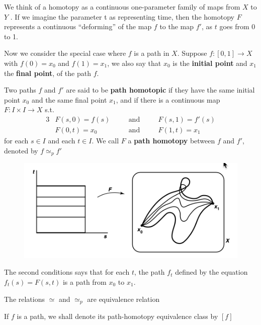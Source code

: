 \documentclass[11pt]{article}
\begin{document}
We think of a homotopy as a continuous one-parameter family of maps from \(X\) to \(Y\) . If we
imagine the parameter t as representing time, then the homotopy \(F\) represents a continuous
``deforming''  of the map \(f\) to the map \(f'\), as \(t\) goes from 0 to 1.

Now we consider the special case where \(f\) is a path in \(X\). Suppose \(f:[0,1]\to X\)
with \(f(0)=x_0\) and \(f(1)=x_1\), we also say that \(x_0\) is the \textbf{initial point} and \(x_1\) the
\textbf{final point}, of the path \(f\).

\begin{definition}[]
Two paths \(f\) and \(f'\) are said to be \textbf{path homotopic} if they have the same initial
point \(x_0\) and the same final point \(x_1\), and if there is a continuous map \(F:I\times I\to X\)
s.t.
\begin{alignat*}{3}
&F(s,0)=f(s)\quad&&\text{and}\quad&&F(s,1)=f'(s)\\
&F(0,t)=x_0&&\text{and }&&F(1,t)=x_1
\end{alignat*}
for each \(s\in I\) and each \(t\in I\). We call \(F\) a \textbf{path homotopy} between \(f\) and \(f'\),
denoted by \(f\simeq_p f'\)
\begin{figure}[htbp]
\centering
\includegraphics[width=.9\textwidth]{../images/Topology/9.png}
\label{}
\end{figure}
\end{definition}

The second conditions says that for each \(t\), the path \(f_t\) defined by the
equation \(f_t(s)=F(s,t)\) is a path from \(x_0\) to \(x_1\).

\begin{lemma}[]
The relations \(\simeq\) and \(\simeq_p\) are equivalence relation
\end{lemma}

If \(f\) is a path, we shall denote its path-homotopy equivalence class by \([f]\)
\end{document}
